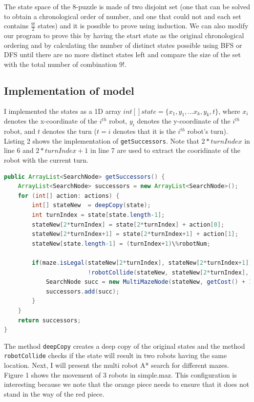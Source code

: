 \documentclass[9.5pt]{extarticle}
\begin{document}
The state space of the 8-puzzle is made of two disjoint set (one that can be solved to obtain a chronological order of number, and one that could not and each set contains $\frac{9!}{2}$ states) and it is possible to prove using induction. We can also modify our program to prove this by having the start state as the original chronological ordering and by calculating the number of distinct states possible using BFS or DFS until there are no more distinct states left and compare the size of the set with the total number of combination $9!$.

\subsection{Implementation of model}

I implemented the states as a 1D array $int[] state = \{x_1,y_1, ... x_k,y_k,t\}$, where $x_i$ denotes the x-coordinate of the $i^{th}$ robot, $y_i$ denotes the y-coordinate of the $i^{th}$ robot, and $t$ denotes the turn  ($t=i$ denotes that it is the $i^{th}$ robot's turn). Listing 2 shows the implementation of \verb`getSuccessors`. Note that  $2*turnIndex$ in line 6 and $2*turnIndex +1$ in line 7 are used to extract the cooridinate of the robot with the current turn.

\begin{lstlisting}[language=java,caption={Java code for getSuccessors for multi robot maze problem}]
public ArrayList<SearchNode> getSuccessors() {
	ArrayList<SearchNode> successors = new ArrayList<SearchNode>();
	for (int[] action: actions) {
		int[] stateNew  = deepCopy(state);
		int turnIndex = state[state.length-1];
		stateNew[2*turnIndex] = state[2*turnIndex] + action[0];
		stateNew[2*turnIndex+1] = state[2*turnIndex+1] + action[1];
		stateNew[state.length-1] = (turnIndex+1)\%robotNum;
		
		if(maze.isLegal(stateNew[2*turnIndex], stateNew[2*turnIndex+1]) &&
                        !robotCollide(stateNew, stateNew[2*turnIndex], stateNew[2*turnIndex+1])){
			SearchNode succ = new MultiMazeNode(stateNew, getCost() + 1.0);
			successors.add(succ);
		}
	}
	return successors;
}
\end{lstlisting}

The method \verb`deepCopy` creates a deep copy of the original states and the method \verb`robotCollide` checks if the state will result in two robots having the same location. Next, I will present the multi robot A* search for different mazes. Figure 1 shows the movement of 3 robots in simple.maz. This configuration is interesting because we note that the orange piece needs to ensure that it does not stand in the way of the red piece. 
\end{document}
